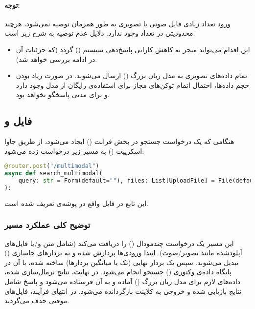 \documentclass{article}
\begin{document}
\paragraph{توجه:}

ورود تعداد زیادی فایل صوتی یا تصویری به طور همزمان توصیه نمی‌شود، هرچند محدودیتی در تعداد وجود ندارد. دلایل عدم توصیه به شرح زیر است:

\begin{itemize}
    \item این اقدام می‌تواند منجر به کاهش کارایی پاسخ‌دهی سیستم () گردد (که جزئیات آن در ادامه بررسی خواهد شد).
    \item تمام داده‌های تصویری به مدل زبان بزرگ () ارسال می‌شوند. در صورت زیاد بودن حجم داده‌ها، احتمال اتمام توکن‌های مجاز برای استفاده‌ی رایگان از مدل وجود دارد و  برای مدتی پاسخگو نخواهد بود.
\end{itemize}


\subsection{فایل  و }

هنگامی که یک درخواست جستجو در بخش فرانت () ایجاد می‌شود، از طریق جاوا اسکریپت () به مسیر  زیر درخواست زده می‌شود:

\begin{latin}
\begin{lstlisting}[language=Python]
@router.post("/multimodal")
async def search_multimodal(
    query: str = Form(default=""), files: List[UploadFile] = File(default=[])
):
\end{lstlisting}
\end{latin}
این تابع در فایل  واقع در پوشه‌ی  تعریف شده است.

\subsubsection{توضیح کلی عملکرد مسیر }
این مسیر یک درخواست چندمودال () را دریافت می‌کند (شامل متن و/یا فایل‌های آپلودشده مانند تصویر/صوت). ابتدا ورودی‌ها پردازش شده و به بردارهای جاسازی () تبدیل می‌شوند. سپس یک بردار نهایی (تک یا میانگین بردارها) ساخته شده، با آن در پایگاه داده‌ی وکتوری () جستجو انجام می‌شود. در نهایت، نتایج نرمال‌سازی شده، داده‌های لازم برای مدل زبان بزرگ () آماده و به آن فرستاده می‌شود و پاسخ  شامل نتایج بازیابی شده و خروجی  به کلاینت بازگردانده می‌شود. در انتهای فرآیند، فایل‌های موقتی حذف می‌گردند.
\end{document}
